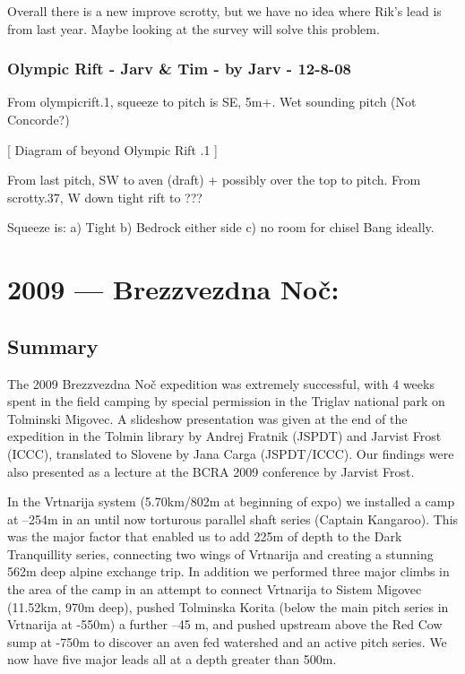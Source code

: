 Overall there is a new improve scrotty, but we have no idea where Rik's
lead is from last year. Maybe looking at the survey will solve this
problem.


\subsection{Olympic Rift - Jarv \& Tim - by Jarv -
12-8-08}\label{olympic-rift---jarv-tim---by-jarv---12-8-08}

From olympicrift.1, squeeze to pitch is SE, 5m+. Wet sounding pitch (Not
Concorde?)

{[} Diagram of beyond Olympic Rift .1 {]}

From last pitch, SW to aven (draft) + possibly over the top to pitch.
From scrotty.37, W down tight rift to ???

Squeeze is: a) Tight b) Bedrock either side c) no room for chisel Bang
ideally.


\chapter{2009 --- Brezzvezdna Noč:}\label{brezzvezdna-noux10d}

\section{Summary}\label{summary}

The 2009 Brezzvezdna Noč expedition was extremely successful, with 4
weeks spent in the field camping by special permission in the Triglav
national park on Tolminski Migovec. A slideshow presentation was given
at the end of the expedition in the Tolmin library by Andrej Fratnik
(JSPDT) and Jarvist Frost (ICCC), translated to Slovene by Jana Carga
(JSPDT/ICCC). Our findings were also presented as a lecture at the BCRA
2009 conference by Jarvist Frost.

In the Vrtnarija system (5.70km/802m at beginning of expo) we installed
a camp at --254m in an until now torturous parallel shaft series
(Captain Kangaroo). This was the major factor that enabled us to add
225m of depth to the Dark Tranquillity series, connecting two wings of
Vrtnarija and creating a stunning 562m deep alpine exchange trip. In
addition we performed three major climbs in the area of the camp in an
attempt to connect Vrtnarija to Sistem Migovec (11.52km, 970m deep),
pushed Tolminska Korita (below the main pitch series in Vrtnarija at
-550m) a further --45 m, and pushed upstream above the Red Cow sump at
-750m to discover an aven fed watershed and an active pitch series. We
now have five major leads all at a depth greater than 500m.

